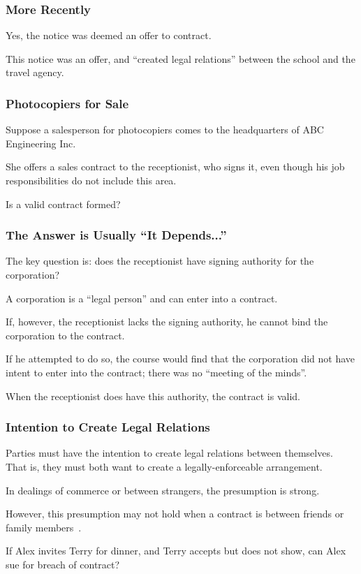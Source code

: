 \begin{frame}
\frametitle{More Recently}

Yes, the notice was deemed an offer to contract.

This notice was an offer, and ``created legal relations'' between the school and the travel agency. 

\end{frame}



\begin{frame}
\frametitle{Photocopiers for Sale}

Suppose a salesperson for photocopiers comes to the headquarters of ABC Engineering Inc. 

She offers a sales contract to the receptionist, who signs it, even though his job responsibilities do not include this area.

Is a valid contract formed?

\end{frame}



\begin{frame}
\frametitle{The Answer is Usually ``It Depends...''}

The key question is: does the receptionist have signing authority for the corporation?

A corporation is a ``legal person'' and can enter into a contract.

If, however, the receptionist lacks the signing authority, he cannot bind the corporation to the contract.

If he attempted to do so, the course would find that the corporation did not have intent to enter into the contract; there was no ``meeting of the minds''.

When the receptionist does have this authority, the contract is valid.

\end{frame}



\begin{frame}
\frametitle{Intention to Create Legal Relations}

Parties must have the intention to create legal relations between themselves.\\
\quad That is, they must both want to create a legally-enforceable arrangement.

In dealings of commerce or between strangers, the presumption is strong.

However, this presumption may not hold when a contract is between friends or family members~\cite{lba}.

If Alex invites Terry for dinner, and Terry accepts but does not show, can Alex sue for breach of contract?

\end{frame}



